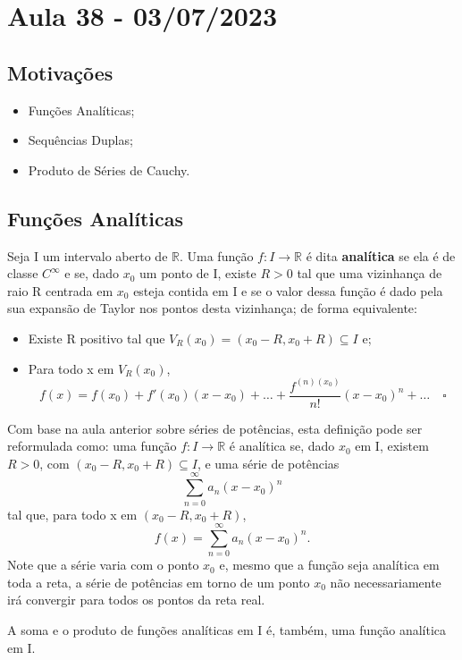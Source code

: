 \documentclass[../analysis_notes.tex]{subfiles}
\begin{document}
\section{Aula 38 - 03/07/2023}
\subsection{Motivações}
\begin{itemize}
	\item Funções Analíticas;
	\item Sequências Duplas;
	\item Produto de Séries de Cauchy.
\end{itemize}
\subsection{Funções Analíticas}
\begin{def*}
	Seja I um intervalo aberto de \(\mathbb{R}\). Uma função \(f:I\rightarrow \mathbb{R}\) é dita \textbf{analítica} se ela é de classe \(C^{\infty}\) e se, dado \(x_{0}\) um ponto de I, existe \(R>0\) tal que uma vizinhança de raio R centrada em \(x_{0}\) esteja contida em I e se o valor dessa função é dado pela sua expansão de Taylor nos pontos desta vizinhança; de forma equivalente:
	\begin{itemize}
		\item Existe R positivo tal que \(V_{R}(x_{0})=(x_{0}-R, x_{0}+R)\subseteq I\) e;
		\item Para todo x em \(V_{R}(x_{0})\),
		      \[
			      f(x)=f(x_{0})+f'(x_{0})(x-x_{0})+\dotsc +\frac{f^{(n)(x_{0})}}{n!}(x-x_{0})^{n}+\dotsc \quad \square
		      \]
	\end{itemize}
\end{def*}
Com base na aula anterior sobre séries de potências, esta definição pode ser reformulada como: uma função \(f:I\rightarrow \mathbb{R}\) é analítica se, dado \(x_{0}\) em I, existem \(R>0\), com \((x_{0}-R, x_{0}+R)\subseteq I\), e uma série de potências
\[
	\sum\limits_{n=0}^{\infty}a_{n}(x-x_{0})^{n}
\]
tal que, para todo x em \((x_{0}-R, x_{0}+R)\),
\[
	f(x)=\sum\limits_{n=0}^{\infty}a_{n}(x-x_{0})^{n}.
\]
Note que a série varia com o ponto \(x_{0}\) e, mesmo que a função seja analítica em toda a reta, a série de potências em torno de um ponto \(x_{0}\) não necessariamente irá convergir para todos os pontos da reta real.
\begin{theorem*}
	A soma e o produto de funções analíticas em I é, também, uma função analítica em I.
\end{theorem*}
\end{document}
